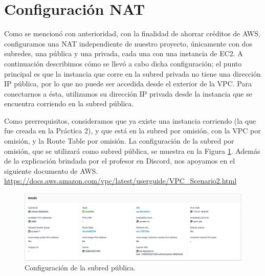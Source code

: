 \documentclass{article}
\begin{document}


\section{Configuraci\'on NAT}

Como se mencion\'o con anterioridad, con la finalidad
de ahorrar cr\'editos de AWS, configuramos una NAT
independiente de nuestro proyecto, \'unicamente con
dos subredes, una p\'ublica y una privada, cada una
con una instancia de EC2.   A continuaci\'on describimos
c\'omo se llev\'o a cabo dicha configuraci\'on; el punto
principal es que la instancia que corre en la subred
privada no tiene una direcci\'on IP p\'ublica, por lo
que no puede ser accedida desde el exterior de la VPC.
Para conectarnos a \'esta, utilizamos su direcci\'on
IP privada desde la instancia que se encuentra corriendo
en la subred p\'ublica.

Como prerrequisitos, consideramos que ya existe una
instancia corriendo (la que fue creada en la Pr\'actica
2), y que est\'a en la subred por omisi\'on, con la
VPC por omisi\'on, y la Route Table por omisi\'on.
La configuraci\'on de la subred por omisi\'on, que se
utilizar\'a como subred p\'ublica, se muestra en la
Figura \ref{fig:NAT-pubSubnet}.   Adem\'as de la
explicaci\'on brindada por el profesor en Discord,
nos apoyamos en el siguiente documento de AWS.
\href{https://docs.aws.amazon.com/vpc/latest/userguide/VPC_Scenario2.html}{https://docs.aws.amazon.com/vpc/latest/userguide/VPC\_Scenario2.html}

\begin{figure}[H]
  \centering
  \includegraphics[width=\textwidth]{SSNAT/publicSubnet}
  \caption{Configuraci\'on de la subred p\'ublica.}
  \label{fig:NAT-pubSubnet}
\end{figure}
\end{document}
